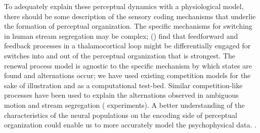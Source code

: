 \documentclass{frontiersSCNS} %
\begin{document}
To adequately explain these perceptual dynamics with a physiological model, there should be some description of the sensory coding mechanisms that underlie the formation of perceptual organization. The specific mechanisms for switching in human stream segregation may be complex; (\cite{Kondo2009}) find that feedforward and feedback processes in a thalamocortical loop might be differentially engaged for switches into and out of the perceptual organization that is strongest. The renewal process model is agnostic to the specific mechanism by which states are found and alternations occur; we have used existing competition models for the sake of illustration and as a computational test-bed. Similar competition-like processes have been used to explain the alternations observed in ambiguous motion \cite{Pastukhov2013} and stream segregation (\cite{Mill2013} experiments). A better understanding of the characteristics of the neural populations on the encoding side of perceptual organization could enable us to more accurately model the psychophysical data.
 .
\end{document}
